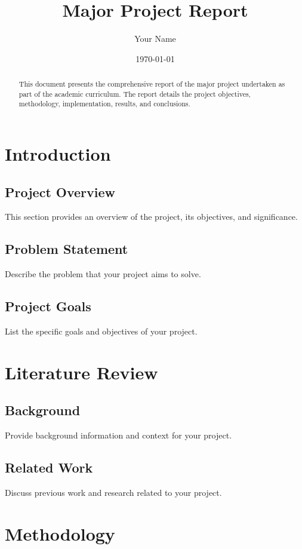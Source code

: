 \documentclass[12pt,a4paper]{report}
\title{Major Project Report}
\author{Your Name}
\date{\today}
\begin{document}
\maketitle

\begin{abstract}
This document presents the comprehensive report of the major project undertaken as part of the academic curriculum. The report details the project objectives, methodology, implementation, results, and conclusions.
\end{abstract}

\tableofcontents

\chapter{Introduction}
\section{Project Overview}
This section provides an overview of the project, its objectives, and significance.

\section{Problem Statement}
Describe the problem that your project aims to solve.

\section{Project Goals}
List the specific goals and objectives of your project.

\chapter{Literature Review}
\section{Background}
Provide background information and context for your project.

\section{Related Work}
Discuss previous work and research related to your project.

\chapter{Methodology}
\end{document}
